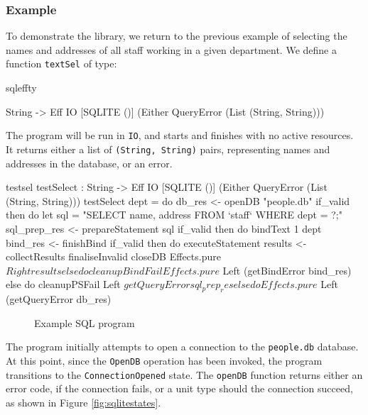 \subsubsection{Example}

To demonstrate the 
library, we return to the previous example of selecting the names and addresses
of all staff working in a given department. 
We define a function \texttt{textSel} of type:

\noindent
\begin{SaveVerbatim}{sqleffty}

String -> Eff IO [SQLITE ()] 
           (Either QueryError (List (String, String)))

\end{SaveVerbatim}

\noindent
The program will be run in \texttt{IO}, and starts and finishes with no active
resources.  It returns either a list of \texttt{(String, String)} pairs,
representing names and addresses in the database, or an error.

\begin{SaveVerbatim}{testsel}
testSelect : String -> Eff IO [SQLITE ()] 
             (Either QueryError (List (String, String)))
testSelect dept = do
  db_res <- openDB "people.db"
  if_valid then do
    let sql = "SELECT name, address FROM `staff` 
                    WHERE dept = ?;"
    sql_prep_res <- prepareStatement sql
    if_valid then do 
      bindText 1 dept
      bind_res <- finishBind
      if_valid then do
        executeStatement
        results <- collectResults
        finaliseInvalid
        closeDB
        Effects.pure $ Right results
      else do
        cleanupBindFail
        Effects.pure $ Left (getBindError bind_res)
    else do
      cleanupPSFail
      Left $ getQueryError sql_prep_res
  else do 
    Effects.pure $ Left (getQueryError db_res)
\end{SaveVerbatim}

\begin{figure}[h]
\caption{Example SQL program}
\label{fig:testsel}
\end{figure}

The program initially attempts to open a connection to the \texttt{people.db}
database. At this point, since the \texttt{OpenDB} operation has been invoked,
the program transitions to the \texttt{ConnectionOpened} state. The
\texttt{openDB} function returns either an error code, if the connection fails, or a unit type should the connection succeed, as shown in Figure \ref{fig:sqlitestates}.

